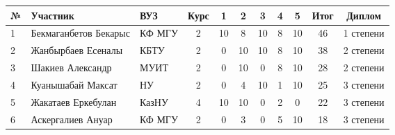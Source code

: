 \begin{center}
\begin{tabular}{|l|l|l|c|c|c|c|c|c|c|c|}
\hline
№ & Участник & ВУЗ & Курс & 1 & 2 & 3 & 4 & 5 & Итог & Диплом \\
\hline
1 & Бекмаганбетов Бекарыс & КФ МГУ & 2 & 10 & 8 & 10 & 8 & 10 & 46 & 1 степени \\
\hline
2 & Жанбырбаев Есеналы & КБТУ & 2 & 0 & 10 & 10 & 8 & 10 & 38 & 2 степени \\
\hline
3 & Шакиев Александр & МУИТ & 2 & 0 & 10 & 0 & 8 & 10 & 28 & 2 степени \\
\hline
4 & Куанышабай Максат & НУ & 2 & 0 & 4 & 10 & 1 & 10 & 25 & 3 степени \\
\hline
5 & Жакатаев Еркебулан & КазНУ & 4 & 10 & 10 & 0 & 2 & 0 & 22 & 3 степени \\
\hline
6 & Аскергалиев Ануар & КФ МГУ & 2 & 0 & 3 & 0 & 5 & 10 & 18 & 3 степени \\
\hline
\end{tabular}
\end{center}